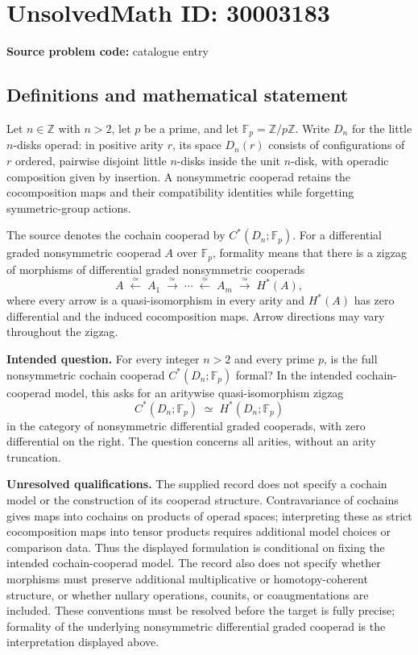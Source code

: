 \documentclass[11pt]{article}
\newcommand{\Z}{\mathbb{Z}}
\newcommand{\F}{\mathbb{F}}
\begin{document}
\section*{UnsolvedMath ID: 30003183}
\textbf{Source problem code:} catalogue entry
\subsection{Definitions and mathematical statement}
Let \(n\in\Z\) with \(n>2\), let \(p\) be a prime, and let \(\F_p=\Z/p\Z\). Write \(D_n\) for the little \(n\)-disks operad: in positive arity \(r\), its space \(D_n(r)\) consists of configurations of \(r\) ordered, pairwise disjoint little \(n\)-disks inside the unit \(n\)-disk, with operadic composition given by insertion. A nonsymmetric cooperad retains the cocomposition maps and their compatibility identities while forgetting symmetric-group actions.

The source denotes the cochain cooperad by \(C^*(D_n;\F_p)\). For a differential graded nonsymmetric cooperad \(A\) over \(\F_p\), formality means that there is a zigzag of morphisms of differential graded nonsymmetric cooperads
\[
A\;\xleftarrow{\simeq}\;A_1\;\xrightarrow{\simeq}\;\cdots\;\xleftarrow{\simeq}\;A_m\;\xrightarrow{\simeq}\;H^*(A),
\]
where every arrow is a quasi-isomorphism in every arity and \(H^*(A)\) has zero differential and the induced cocomposition maps. Arrow directions may vary throughout the zigzag.

\textbf{Intended question.} For every integer \(n>2\) and every prime \(p\), is the full nonsymmetric cochain cooperad \(C^*(D_n;\F_p)\) formal? In the intended cochain-cooperad model, this asks for an aritywise quasi-isomorphism zigzag
\[
C^*(D_n;\F_p)\;\simeq\;H^*(D_n;\F_p)
\]
in the category of nonsymmetric differential graded cooperads, with zero differential on the right. The question concerns all arities, without an arity truncation.

\textbf{Unresolved qualifications.} The supplied record does not specify a cochain model or the construction of its cooperad structure. Contravariance of cochains gives maps into cochains on products of operad spaces; interpreting these as strict cocomposition maps into tensor products requires additional model choices or comparison data. Thus the displayed formulation is conditional on fixing the intended cochain-cooperad model. The record also does not specify whether morphisms must preserve additional multiplicative or homotopy-coherent structure, or whether nullary operations, counits, or coaugmentations are included. These conventions must be resolved before the target is fully precise; formality of the underlying nonsymmetric differential graded cooperad is the interpretation displayed above.
\end{document}
